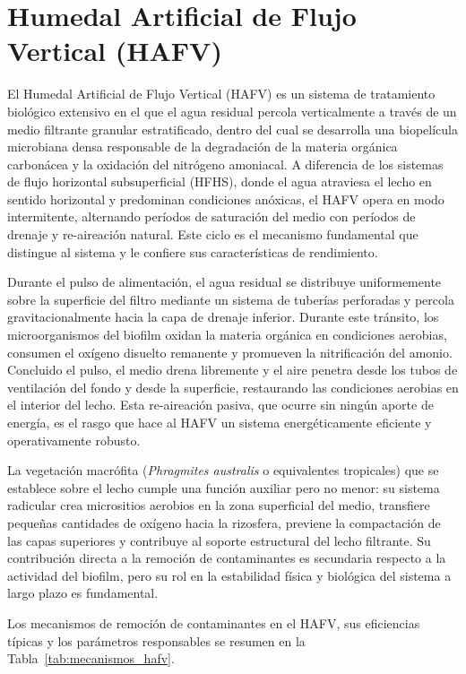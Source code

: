 \documentclass[12pt,a4paper]{article}
\begin{document}
\section{Humedal Artificial de Flujo Vertical (HAFV)}




El Humedal Artificial de Flujo Vertical (HAFV) es un sistema de tratamiento biológico extensivo en el que el agua residual percola verticalmente a través de un medio filtrante granular estratificado, dentro del cual se desarrolla una biopelícula microbiana densa responsable de la degradación de la materia orgánica carbonácea y la oxidación del nitrógeno amoniacal. A diferencia de los sistemas de flujo horizontal subsuperficial (HFHS), donde el agua atraviesa el lecho en sentido horizontal y predominan condiciones anóxicas, el HAFV opera en modo intermitente, alternando períodos de saturación del medio con períodos de drenaje y re-aireación natural. Este ciclo es el mecanismo fundamental que distingue al sistema y le confiere sus características de rendimiento.

Durante el pulso de alimentación, el agua residual se distribuye uniformemente sobre la superficie del filtro mediante un sistema de tuberías perforadas y percola gravitacionalmente hacia la capa de drenaje inferior. Durante este tránsito, los microorganismos del biofilm oxidan la materia orgánica en condiciones aerobias, consumen el oxígeno disuelto remanente y promueven la nitrificación del amonio. Concluido el pulso, el medio drena libremente y el aire penetra desde los tubos de ventilación del fondo y desde la superficie, restaurando las condiciones aerobias en el interior del lecho. Esta re-aireación pasiva, que ocurre sin ningún aporte de energía, es el rasgo que hace al HAFV un sistema energéticamente eficiente y operativamente robusto.

La vegetación macrófita (\textit{Phragmites australis} o equivalentes tropicales) que se establece sobre el lecho cumple una función auxiliar pero no menor: su sistema radicular crea micrositios aerobios en la zona superficial del medio, transfiere pequeñas cantidades de oxígeno hacia la rizosfera, previene la compactación de las capas superiores y contribuye al soporte estructural del lecho filtrante. Su contribución directa a la remoción de contaminantes es secundaria respecto a la actividad del biofilm, pero su rol en la estabilidad física y biológica del sistema a largo plazo es fundamental.

Los mecanismos de remoción de contaminantes en el HAFV, sus eficiencias típicas y los parámetros responsables se resumen en la Tabla~\ref{tab:mecanismos_hafv}.
\end{document}
